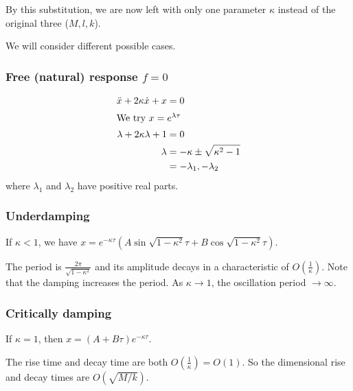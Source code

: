 \documentclass[a4paper]{article}
\begin{document}
By this substitution, we are now left with only one parameter $\kappa$ instead of the original three ($M, l, k$).

We will consider different possible cases.

\subsubsection*{Free (natural) response \texorpdfstring{$f = 0$}{f = 0}}
\begin{align*}
  \ddot x + 2\kappa \dot x + x &= 0\\
  \intertext{We try $x = e^{\lambda \tau}$}
  \lambda + 2\kappa\lambda + 1 &= 0\\
  \lambda &= -\kappa \pm \sqrt{\kappa^2 - 1}\\
  &= -\lambda_1, -\lambda_2
\end{align*}
where $\lambda_1$ and $\lambda_2$ have positive real parts.

\subsubsection*{Underdamping}
If $\kappa < 1$, we have $x = e^{-\kappa\tau}(A\sin \sqrt{1 - \kappa^2}\tau  +B\cos \sqrt{1 - \kappa^2}\tau)$.

The period is $\frac{2\pi}{\sqrt{1 - \kappa^2}}$ and its amplitude decays in a characteristic of $O(\frac{1}{\kappa})$. Note that the damping increases the period. As $\kappa \to 1$, the oscillation period $\to \infty$.
\begin{center}
\end{center}

\subsubsection*{Critically damping}
If $\kappa = 1$, then $x = (A + B\tau)e^{-\kappa\tau}$.

The rise time and decay time are both $O(\frac{1}{\kappa}) = O(1)$. So the dimensional rise and decay times are $O(\sqrt{M/k})$.
\begin{center}
\end{center}
\end{document}
